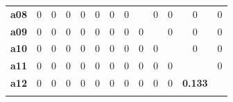 \documentclass[final,3p,times,twocolumn]{elsarticle}
\begin{document}
\begin{table}[h]
{{\begin{tabular}{c|c|c|c|c|c|c|c|c|c|c|c|c|}
			\hhline{~------------}
		 {\bf a08} &          0 &          0 &          0 &          0 &          0 &          0 &          0 &       \color{white}{\bf 1.0}\cellcolor[gray]{.0}  &          0 &          0 &          0 &          0 \\
			\hhline{~------------}
		 {\bf a09} &          0 &          0 &          0 &          0 &          0 &          0 &          0 &          0 &       \color{white}{\bf 1.0}\cellcolor[gray]{.0}  &          0 &          0 &          0 \\
			\hhline{~------------}
		 {\bf a10} &          0 &          0 &          0 &          0 &          0 &          0 &          0 &          0 &          0 &       \color{white}{\bf 1.0}\cellcolor[gray]{.0}  &          0 &          0 \\
			\hhline{~------------}
		 {\bf a11} &          0 &          0 &          0 &          0 &          0 &          0 &          0 &          0 &          0 &          0 &       \color{white}{\bf 1.0}\cellcolor[gray]{.0}  &          0 \\
			\hhline{~------------}
		 {\bf a12} &          0 &          0 &          0 &          0 &          0 &          0 &          0 &          0 &          0 &          0 &          {\bf 0.133}\cellcolor[gray]{.8} &       \color{white}{\bf 0.867}\cellcolor[gray]{.2}  \\
			\hhline{~------------}
		\end{tabular} 
	}
	}
	
\end{table}
\end{document}
